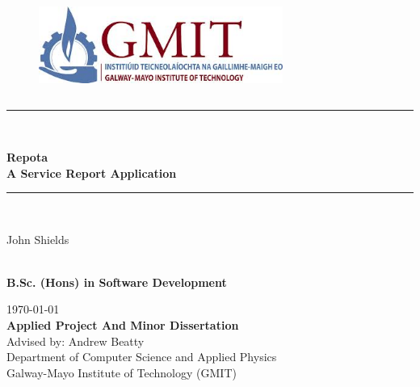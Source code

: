 \documentclass{book}
\newcommand*{\customTitle}{\begingroup
\centering %
\vspace*{\baselineskip} %
\rule{\linewidth}{0.5mm} \\[0.4cm] %

\newcommand{\projecttitle}{Repota \\[2ex] A Service Report Application}
\newcommand{\projectprogramme}{B.Sc. (Hons) in Software Development}
\newcommand{\projectauthor}{John Shields}
\newcommand{\projectadvisor}{Andrew Beatty}

\textbf{\LARGE \projecttitle}\\[0.2\baselineskip] %


\rule{\linewidth}{0.5mm} \\[0.4cm] %
\normalsize

{\projectauthor \par}
\textbf{\\\projectprogramme}  

\vspace*{2\baselineskip} %
\vfill %
{\scshape \today} \\[0.3\baselineskip] %
\textbf{Applied Project And Minor Dissertation}\\[0.3cm]

{{Advised by: \projectadvisor}}\\[0.1cm] %

{Department of Computer Science and Applied Physics \\ Galway-Mayo Institute of Technology (GMIT)}\par 

\endgroup}
\begin{document}
 
\begin{figure}
\begin{center}
\includegraphics[width=8cm,height=3.3cm,keepaspectratio]{images/misc/gmit-logo.jpg}
\end{center}
\end{figure}
\customTitle 
\tableofcontents
\listoffigures
{} 










\end{document}
